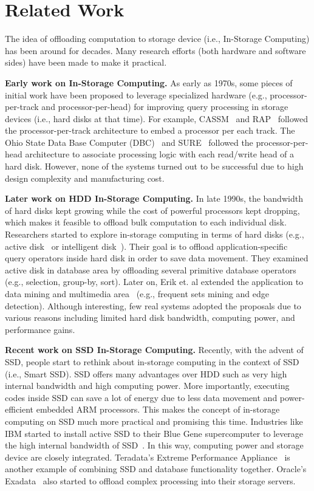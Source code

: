 
\section{Related Work}\label{sec:relatedWork}
The idea of offloading computation to storage device (i.e., In-Storage Computing) has been around for decades. Many research efforts (both hardware and software sides) have been made to make it practical.

\textbf{Early work on In-Storage Computing.} As early as 1970s, some pieces of initial work have been proposed to leverage specialized hardware (e.g., processor-per-track and processor-per-head) for improving query processing in storage devices (i.e., hard disks at that time). For example, CASSM~\cite{Su1975} and RAP~\cite{Ozkarahan1977} followed the processor-per-track architecture to embed a processor per each track. The Ohio State Data Base Computer (DBC)~\cite{Kannan1978} and SURE~\cite{LeilichSZ78} followed the processor-per-head architecture to associate processing logic with each read/write head of a hard disk. However, none of the systems turned out to be successful due to high design complexity and manufacturing cost.

\textbf{Later work on HDD In-Storage Computing.}
In late 1990s, the bandwidth of hard disks kept growing while the cost of powerful processors kept dropping, which makes it feasible to offload bulk computation to each individual disk. Researchers started to explore in-storage computing in terms of hard disks (e.g., active disk~\cite{Acharya1998ADP} or intelligent disk~\cite{Keeton1998}). Their goal is to offload application-specific query operators inside hard disk in order to save data movement. They examined active disk in database area by offloading several primitive database operators (e.g., selection, group-by, sort). Later on, Erik et. al extended the application to data mining and multimedia area~\cite{Riedel1998ASL} (e.g., frequent sets mining and edge detection). Although interesting, few real systems adopted the proposals due to various reasons including limited hard disk bandwidth, computing power, and performance gains.



\textbf{Recent work on SSD In-Storage Computing.}
Recently, with the advent of SSD, people start to rethink about in-storage computing in the context of SSD (i.e., Smart SSD).
SSD offers many advantages over HDD such as very high internal bandwidth and high computing power. More importantly, executing codes inside SSD can save a lot of energy due to less data movement and power-efficient embedded ARM processors. %
This makes the concept of in-storage computing on SSD much more practical and promising this time.
Industries like IBM started to install active SSD to their Blue Gene supercomputer to leverage the high internal bandwidth of SSD~\cite{Julich13}. In this way, computing power and storage device are closely integrated. Teradata's Extreme Performance Appliance~\cite{Teradata20} is another example of combining SSD and database functionality together. Oracle's Exadata~\cite{Oracle2010} also started to offload complex processing into their storage servers.

